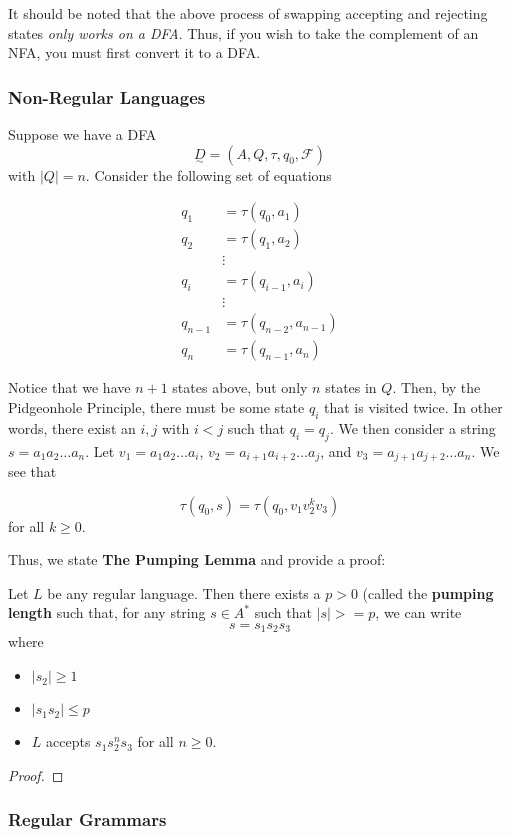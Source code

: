 It should be noted that the above process of swapping accepting and rejecting states \textit{only works on a DFA}. Thus, if you wish to take the complement of an NFA, you must first convert it to a DFA. 

\subsubsection{Non-Regular Languages}
Suppose we have a DFA \[\underset{\sim}{D}=(A, Q, \tau, q_0, \mathcal{F})\] with $|Q|=n$. Consider the following set of equations

\begin{align*}
      q_1 &= \tau(q_0, a_1)\\
      q_2 &= \tau(q_1, a_2)\\
          &\vdots\\
      q_i &= \tau(q_{i-1}, a_i)\\
          &\vdots\\
      q_{n-1} &= \tau(q_{n-2}, a_{n-1})\\
      q_n &= \tau(q_{n-1}, a_n)
\end{align*}

Notice that we have $n+1$ states above, but only $n$ states in $Q$. Then, by the Pidgeonhole Principle, there must be some state $q_i$ that is visited twice. In other words, there exist an $i, j$ with $i < j$ such that $q_i=q_j$. We then consider a string $s=a_1a_2\hdots a_n$. Let $v_1=a_1a_2\hdots a_i$, $v_2=a_{i+1}a_{i+2}\hdots a_j$, and $v_3=a_{j+1}a_{j+2}\hdots a_n$. We see that 

\[\tau(q_0, s)=\tau(q_0, v_1v_2^kv_3)\] for all $k\geq0$. 

\begin{center}\end{center}

Thus, we state \textbf{The Pumping Lemma} and provide a proof:

\begin{theorem}
      Let $L$ be any regular language. Then there exists a $p>0$ (called the \textbf{pumping length} such that, for any string $s\in A^*$ such that $|s|>=p$, we can write \[s=s_1s_2s_3\] where 
      \begin{itemize}
            \item $|s_2|\geq 1$
            \item $|s_1s_2|\leq p$
            \item $L$ accepts $s_1s_2^ns_3$ for all $n\geq0$.
      \end{itemize}
\end{theorem}

\begin{proof}

\end{proof}

\subsubsection{Regular Grammars}